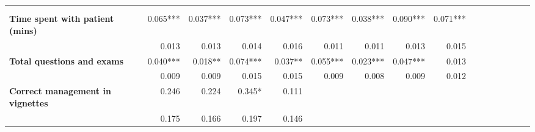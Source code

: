 \begin{tabular}{@{\extracolsep{5pt}}lrrrrrrrrrrrrrrr}
\toprule
&  &  &  &  &  &  &  &  \\
{\bf } &  &  &  &  &  &  &  &  \\
\hline
{\bf Time spent with patient (mins)} & 0.065*** & 0.037*** & 0.073*** & 0.047*** & 0.073*** & 0.038*** & 0.090*** & 0.071*** \\
{\bf } & 0.013\phantom{***} & 0.013\phantom{***} & 0.014\phantom{***} & 0.016\phantom{***} & 0.011\phantom{***} & 0.011\phantom{***} & 0.013\phantom{***} & 0.015\phantom{***} \\
{\bf Total questions and exams} & 0.040*** & 0.018**\phantom{*} & 0.074*** & 0.037**\phantom{*} & 0.055*** & 0.023*** & 0.047*** & 0.013\phantom{***} \\
{\bf } & 0.009\phantom{***} & 0.009\phantom{***} & 0.015\phantom{***} & 0.015\phantom{***} & 0.009\phantom{***} & 0.008\phantom{***} & 0.009\phantom{***} & 0.012\phantom{***} \\
{\bf Correct management in vignettes} & 0.246\phantom{***} & 0.224\phantom{***} & 0.345*\phantom{**} & 0.111\phantom{***} & \phantom{***} & \phantom{***} & \phantom{***} & \phantom{***} \\
{\bf } & 0.175\phantom{***} & 0.166\phantom{***} & 0.197\phantom{***} & 0.146\phantom{***} & \phantom{***} & \phantom{***} & \phantom{***} & \phantom{***} \\

\end{tabular}
